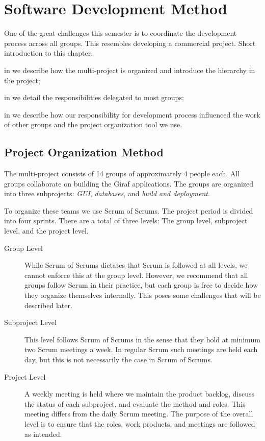 \chapter{Software Development Method}\label{chap:sw_dev_method}
One of the great challenges this semester is to coordinate the development process across all groups. This resembles developing a commercial project. 
Short introduction to this chapter. \dummy~\dummy~\dummy~\dummy~\dummy~\dummy

\begin{chapterorganization}
  \item in  we describe how the multi-project is organized and introduce the hierarchy in the project;
  \item in  we detail the responsibilities delegated to most groups;
  \item in  we describe how our responsibility for development process influenced the work of other groups and the project organization tool we use.
\end{chapterorganization}

\section{Project Organization Method}\label{sec:project_overview}
The multi-project consists of 14 groups of approximately 4 people each. All groups collaborate on building the Giraf applications. The groups are organized into three subprojects: \emph{GUI}, \emph{databases}, and \emph{build and deployment}.

To organize these teams we use Scrum of Scrums. The project period is divided into four sprints. There are a total of three levels: The group level, subproject level, and the project level.

\begin{description}
	\item[Group Level] While Scrum of Scrums dictates that Scrum is followed at all levels, we cannot enforce this at the group level. However, we recommend that all groups follow Scrum in their practice, but each group is free to decide how they organize themselves internally. This poses some challenges that will be described later.
	\item[Subproject Level] This level follows Scrum of Scrums in the sense that they hold at minimum two Scrum meetings a week. In regular Scrum such meetings are held each day, but this is not necessarily the case in Scrum of Scrums.
	\item[Project Level] A weekly meeting is held where we maintain the product backlog, discuss the status of each subproject, and evaluate the method and roles. This meeting differs from the daily Scrum meeting. The purpose of the overall level is to ensure that the roles, work products, and meetings are followed as intended.
\end{description}

